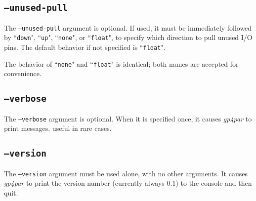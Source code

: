 \documentclass[11pt]{article}
\newcommand{\namestyle}[1]{\textit{#1}}
\newcommand{\tokenstyle}[1]{\texttt{#1}}
\begin{document}
\subsection{\texttt{--unused-pull}}

The \texttt{--unused-pull} argument is optional. If used, it must be immediately followed by ``\tokenstyle{down}",
``\tokenstyle{up}", ``\tokenstyle{none}", or ``\tokenstyle{float}", to specify which direction to pull unused I/O pins.
The default behavior if not specified is ``\tokenstyle{float}".

The behavior of ``\tokenstyle{none}" and ``\tokenstyle{float}" is identical; both names are accepted for convenience.

\subsection{\texttt{--verbose}}

The \texttt{--verbose} argument is optional. When it is specified once, it causes \namestyle{gp4par} to print
messages, useful in rare cases.

\subsection{\texttt{--version}}

The \texttt{--version} argument must be used alone, with no other arguments. It causes \namestyle{gp4par} to print the version number
(currently always 0.1) to the console and then quit.
\end{document}
